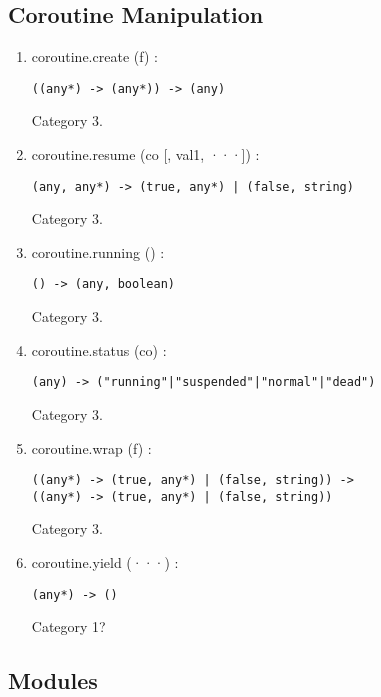 \subsection{Coroutine Manipulation}

\begin{enumerate}
\item coroutine.create (f) :
\begin{verbatim}
((any*) -> (any*)) -> (any)
\end{verbatim}
Category 3.
\item coroutine.resume (co [, val1, ···]) :
\begin{verbatim}
(any, any*) -> (true, any*) | (false, string)
\end{verbatim}
Category 3.
\item coroutine.running () :
\begin{verbatim}
() -> (any, boolean)
\end{verbatim}
Category 3.
\item coroutine.status (co) :
\begin{verbatim}
(any) -> ("running"|"suspended"|"normal"|"dead")
\end{verbatim}
Category 3.
\item coroutine.wrap (f) :
\begin{verbatim}
((any*) -> (true, any*) | (false, string)) ->
((any*) -> (true, any*) | (false, string))
\end{verbatim}
Category 3.
\item coroutine.yield (···) :
\begin{verbatim}
(any*) -> ()
\end{verbatim}
Category 1?
\end{enumerate}

\subsection{Modules}

